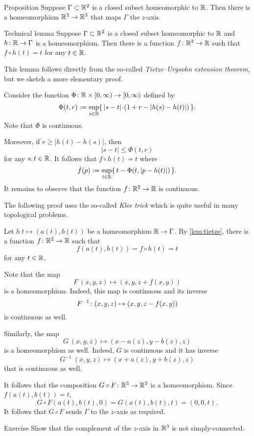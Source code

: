 \begin{thm}{Proposition}\label{prop:home-gamma-z-axis}
Suppose $\Gamma\subset\mathbb{R}^2$ is a closed subset homeomorphic to $\mathbb{R}$.
Then there is a homeomorphism $\mathbb{R}^3\to \mathbb{R}^3$ that maps $\Gamma$ the $z$-axis.
\end{thm}


\begin{thm}{Technical lemma}\label{lem:tietze}
Suppose $\Gamma\subset\mathbb{R}^2$ is a closed subset homeomorphic to $\mathbb{R}$ and $h\colon\mathbb{R}\to\Gamma$ is a homeomorphism.
Then there is a function $f\colon\mathbb{R}^2\to\mathbb{R}$ such that 
$f\circ h(t)=t$ for any $t\in \mathbb{R}$.
\end{thm}

This lemma follows directly from the so-called \emph{Tietze--Urysohn extension theorem},
but we sketch a more elementary proof.

Consider the function $\Phi\colon\mathbb{R}\times[0,\infty)\to[0,\infty)$ defined by 
\[\Phi(t,r)\df \sup_{s\in\RR} \{\,|s-t|\cdot (1+r-|h(s)-h(t)|)\,\}.\]
Note that $\Phi$ is continuous.

Moreover, if $r\ge |h(t)-h(s)|$, then
\[|s-t|\le \Phi(t,r)\]
for any $s,t\in\mathbb{R}$.
It follows that $f\circ h(t)=t$ where  
\[f(p)\mathrel{:=}\sup_{t\in\mathbb{R}}\{\,t-\Phi(t,|p-h(t)|)\,\}.\]
It remains to observe that the function $f\colon\mathbb{R}^2\to\mathbb{R}$ is continuous.
\qeds

The following proof uses the so-called \emph{Klee trick} which is quite useful in many topological problems.

Let $h\:t\mapsto (a(t),b(t))$ be a homeomorphism $\mathbb{R}\to \Gamma$.
By \ref{lem:tietze}, there is a function $f\:\RR^2\z\to\RR$ such that 
\[f(a(t),b(t))=f\circ h(t)=t\]
for any $t\in \mathbb{R}$.

Note that the map 
\[F\:(x,y,z)\mapsto (x,y,z+f(x,y))\] is a homeomorphism.
Indeed, this map is continuous and its inverse 
\[F^{-1}\:(x,y,z)\z\mapsto (x,y,z-f(x,y))\]
is continuous as well.

Similarly, the map 
\[G\:(x,y,z)\mapsto (x-a(z),y-b(z),z)\]
is a homeomorphism as well.
Indeed, $G$ is continuous and it has inverse 
\[G^{-1}\:(x,y,z)\mapsto (x+a(z),y+b(z),z)\]
that is continuous as well.

It follows that the composition $G\circ F\colon\mathbb{R}^3\to\mathbb{R}^3$ is a homeomorphism.
Since $f(a(t),b(t))=t$,
\[G\circ F(a(t),b(t),0)=G(a(t),b(t),t)=(0,0,t).\]
It follows that $G\circ F$ sends $\Gamma$ to the $z$-axis as required.
\qeds

\begin{thm}{Exercise}\label{ex:z-axis}
Show that the complement of the $z$-axis in $\mathbb{R}^3$ is not simply-connected.
\end{thm}

